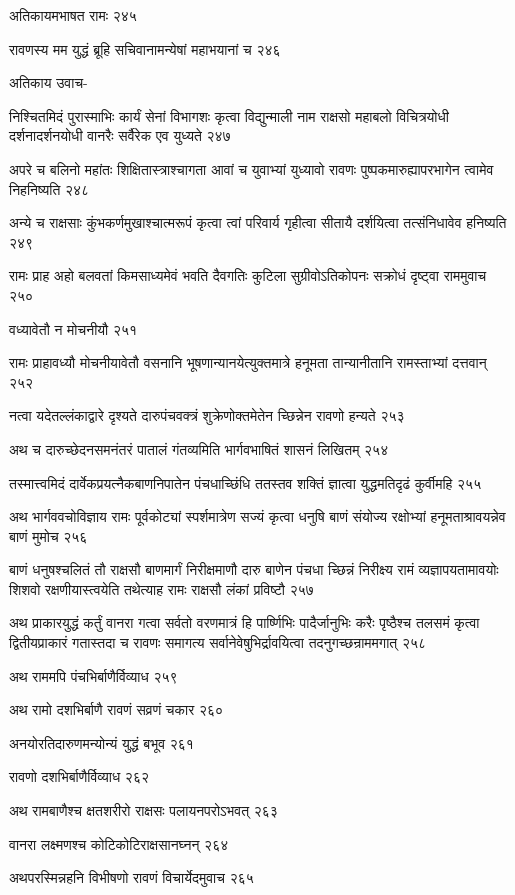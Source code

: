 अतिकायमभाषत रामः २४५

रावणस्य मम युद्धं ब्रूहि सचिवानामन्येषां महाभयानां च २४६

अतिकाय उवाच-

निश्चितमिदं पुरास्माभिः कार्यं सेनां विभागशः कृत्वा विद्युन्माली नाम राक्षसो महाबलो
विचित्रयोधी दर्शनादर्शनयोधी वानरैः सर्वैरेक एव युध्यते २४७

अपरे च बलिनो महांतः शिक्षितास्त्राश्चागता आवां च युवाभ्यां युध्यावो रावणः
पुष्पकमारुह्यापरभागेन त्वामेव निहनिष्यति २४८

अन्ये च राक्षसाः कुंभकर्णमुखाश्चात्मरूपं कृत्वा त्वां परिवार्य गृहीत्वा सीतायै दर्शयित्वा
तत्संनिधावेव हनिष्यति २४९

रामः प्राह अहो बलवतां किमसाध्यमेवं भवति दैवगतिः कुटिला सुग्रीवोऽतिकोपनः सक्रोधं
दृष्ट्वा राममुवाच २५०

वध्यावेतौ न मोचनीयौ २५१

रामः प्राहावध्यौ मोचनीयावेतौ वसनानि भूषणान्यानयेत्युक्तमात्रे हनूमता तान्यानीतानि
रामस्ताभ्यां दत्तवान् २५२

नत्वा यदेतल्लंकाद्वारे दृश्यते दारुपंचवक्त्रं शुक्रेणोक्तमेतेन च्छिन्नेन रावणो हन्यते २५३

अथ च दारुच्छेदनसमनंतरं पातालं गंतव्यमिति भार्गवभाषितं शासनं लिखितम् २५४

तस्मात्त्वमिदं दार्वेकप्रयत्नैकबाणनिपातेन पंचधाच्छिंधि ततस्तव शक्तिं ज्ञात्वा युद्धमतिदृढं
कुर्वीमहि २५५

अथ भार्गववचोविज्ञाय रामः पूर्वकोट्यां स्पर्शमात्रेण सज्यं कृत्वा धनुषि बाणं संयोज्य
रक्षोभ्यां हनूमताश्रावयन्नेव बाणं मुमोच २५६

बाणं धनुषश्चलितं तौ राक्षसौ बाणमार्गं निरीक्षमाणौ दारु बाणेन पंचधा च्छिन्नं निरीक्ष्य
रामं व्यज्ञापयतामावयोः शिशवो रक्षणीयास्त्वयेति तथेत्याह रामः राक्षसौ लंकां प्रविष्टौ
 २५७

अथ प्राकारयुद्धं कर्तुं वानरा गत्वा सर्वतो वरणमात्रं हि पार्ष्णिभिः पादैर्जानुभिः करैः
पृष्ठैश्च तलसमं कृत्वा द्वितीयप्राकारं गतास्तदा च रावणः समागत्य सर्वानेवेषुभिर्द्रावयित्वा
तदनुगच्छन्राममगात् २५८

अथ राममपि पंचभिर्बाणैर्विव्याध २५९

अथ रामो दशभिर्बाणै रावणं सव्रणं चकार २६०

अनयोरतिदारुणमन्योन्यं युद्धं बभूव २६१

रावणो दशभिर्बाणैर्विव्याध २६२

अथ रामबाणैश्च क्षतशरीरो राक्षसः पलायनपरोऽभवत् २६३

वानरा लक्ष्मणश्च कोटिकोटिराक्षसानघ्नन् २६४

अथपरस्मिन्नहनि विभीषणो रावणं विचार्येदमुवाच २६५


